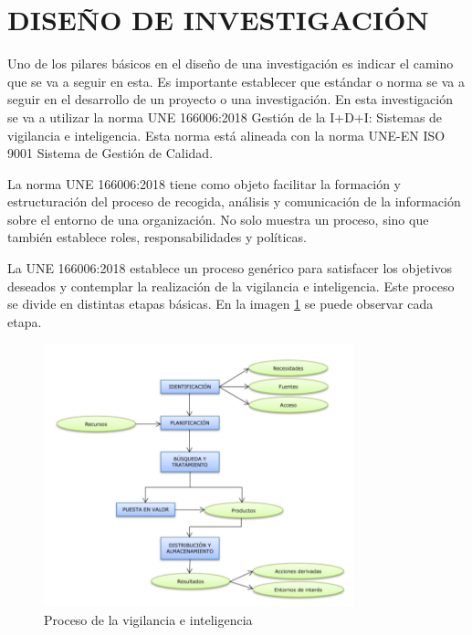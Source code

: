 \section{DISEÑO DE INVESTIGACIÓN}

Uno de los pilares básicos en el diseño de una investigación es indicar el camino que se va a seguir en esta. Es importante establecer que estándar o norma se va a seguir en el desarrollo de un proyecto o una investigación. En esta investigación se va a utilizar la norma UNE 166006:2018 Gestión de la I+D+I: Sistemas de vigilancia e inteligencia. Esta norma está alineada con la norma UNE-EN ISO 9001 Sistema de Gestión de Calidad.

La norma UNE 166006:2018 tiene como objeto facilitar la formación y estructuración del proceso de recogida, análisis y comunicación de la información sobre el entorno de una organización. No solo muestra un proceso, sino que también establece roles, responsabilidades y políticas.

La UNE 166006:2018 establece un proceso genérico para satisfacer los objetivos deseados y contemplar la realización de la vigilancia e inteligencia. Este proceso se divide en distintas etapas básicas. En la imagen  \ref{fig:UNEsquema} se puede observar cada etapa.

\begin{figure}[h]
\centering
 \includegraphics[width=0.8\textwidth]{recursos/UNEEsquema}
\caption{Proceso de la vigilancia e inteligencia}
\label{fig:UNEsquema}
\end{figure}


